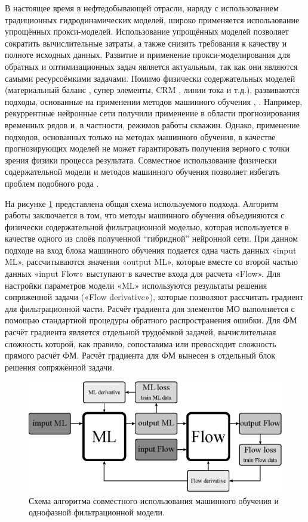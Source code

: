 \documentclass{article}
\begin{document}
В настоящее время в нефтедобывающей отрасли, наряду с использованием традиционных гидродинамических моделей, широко применяется использование упрощённых прокси-моделей. Использование упрощённых моделей позволяет сократить вычислительные затраты, а также снизить требования к качеству и полноте исходных данных. Развитие и применение прокси-моделирования для обратных и оптимизационных задач является актуальным, так как они являются самыми ресурсоёмкими задачами. Помимо физически содержательных моделей (материальный баланс \cite{mus1}, супер элементы, CRM \cite{bek}, линии тока \cite{pot} и т.д.), развиваются подходы, основанные на применении методов машинного обучения \cite{tem}, \cite{uma}. Например, рекуррентные нейронные сети получили применение в области прогнозирования временных рядов и, в частности, режимов работы скважин. Однако, применение подходов, основанных только на методах машинного обучения, в качестве прогнозирующих моделей не может гарантировать получения верного с точки зрения физики процесса результата. Совместное использование физически содержательной модели и методов машинного обучения позволяет избегать проблем подобного рода \cite{kos2}.

На рисунке \ref{fig:schime1} представлена общая схема используемого подхода. Алгоритм работы заключается в том, что методы машинного обучения объединяются с физически содержательной фильтрационной моделью, которая используется в качестве одного из слоёв полученной “гибридной” нейронной сети. При данном подходе на вход блока машинного обучения подается одна часть данных «input ML», рассчитываются значения «output ML», которые вместе со второй частью данных «input Flow» выступают в качестве входа для расчета «Flow». Для настройки параметров модели «ML» используются результаты решения сопряженной задачи («Flow derivative»), которые позволяют рассчитать градиент для фильтрационной части. Расчёт градиента для элементов МО выполняется с помощью стандартной процедуры обратного распространения ошибки. Для ФМ расчёт градиента является отдельной трудоёмкой задачей, вычислительная сложность которой, как правило, сопоставима или превосходит сложность прямого расчёт ФМ. Расчёт градиента для ФМ вынесен в отдельный блок решения сопряжённой задачи.

\begin{figure}
	\centering
	\includegraphics[width=0.7\linewidth]{images/fig1.eps}
	\caption{Схема алгоритма совместного использования машинного обучения и однофазной фильтрационной модели.}
	\label{fig:schime1}
\end{figure}
\end{document}
